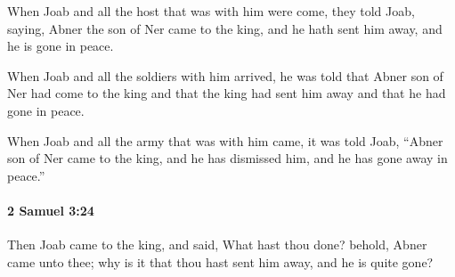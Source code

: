 			\begin{versebox}
					\item[BHS] 
					\item[ASV] When Joab and all the host that was with him were come, they told Joab, saying, Abner the son of Ner came to the king, and he hath sent him away, and he is gone in peace.
					\item[NIV] When Joab and all the soldiers with him arrived, he was told that Abner son of Ner had come to the king and that the king had sent him away and that he had gone in peace.
					\item[NRSV] When Joab and all the army that was with him came, it was told Joab, “Abner son of Ner came to the king, and he has dismissed him, and he has gone away in peace.”
			\end{versebox}

		\paragraph{2 Samuel 3:24} %
			\label{2SAMUEL-3-24}

			Then Joab came to the king, and said, What hast thou done? behold, Abner came unto thee; why is it that thou hast sent him away, and he is quite gone?

